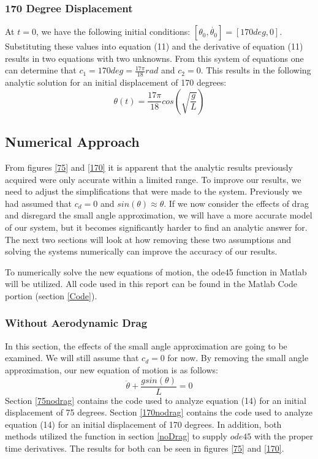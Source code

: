 \documentclass{article}
\begin{document}
\subsubsection{170 Degree Displacement}

At $t = 0$, we have the following initial conditions: $[\theta_0, \dot{\theta_0}] = [170deg, 0]$. Substituting these values into equation (11) and the derivative of equation (11) results in two equations with two unknowns. From this system of equations one can determine that $c_1 = 170 deg = \frac{17\pi}{18} rad$ and $c_2 = 0$. This results in the following analytic solution for an initial displacement of 170 degrees: 
	\begin{equation}
	\theta(t) = \frac{17\pi}{18}cos(\sqrt{\frac{g}{L}})
\end{equation}

\subsection{Numerical Approach}
From figures \ref{75} and \ref{170} it is apparent that the analytic results previously acquired were only accurate within a limited range. To improve our results, we need to adjust the simplifications that were made to the system. Previously we had assumed that $c_d = 0$ and $sin(\theta)\approx \theta$. If we now consider the effects of drag and disregard the small angle approximation, we will have a more accurate model of our system, but it becomes significantly harder to find an analytic answer for. The next two sections will look at how removing these two assumptions and solving the systems numerically can improve the accuracy of our results.

To numerically solve the new equations of motion, the ode45 function in Matlab will be utilized. All code used in this report can be found in the Matlab Code portion (section \ref{Code}).

\subsubsection{Without Aerodynamic Drag}
\label{aeroNoDrag}
In this section, the effects of the small angle approximation are going to be examined. We will still assume that $c_d = 0$ for now. By removing the small angle approximation, our new equation of motion is as follows:
	\begin{equation}
	\boxed{\ddot{\theta} + \frac{gsin(\theta)}{L} = 0}
	\end{equation}
Section \ref{75nodrag} contains the code used to analyze equation (14) for an initial displacement of 75 degrees. Section \ref{170nodrag} contains the code used to analyze equation (14) for an initial displacement of 170 degrees. In addition, both methods utilized the function in section \ref{noDrag} to supply $ode45$ with the proper time derivatives. The results for both can be seen in figures \ref{75} and \ref{170}.
\end{document}
